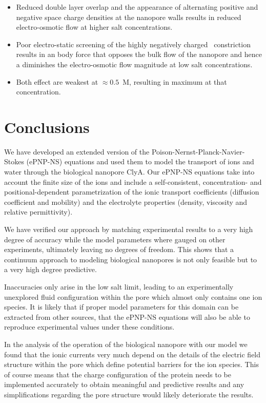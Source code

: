 \documentclass[journal=ancac3,manuscript=article,etalmode=truncate,maxauthors=0,layout=twocolumn]{achemso}
\begin{document}
\begin{itemize}
  \item Reduced double layer overlap and the appearance of alternating positive and negative space charge
  densities at the nanopore walls results in reduced electro-osmotic flow at higher salt concentrations.
  \item Poor electro-static screening of the highly negatively charged \trans\ constriction
  results in an body force that opposes the bulk flow of the nanopore and hence a diminishes the
  electro-osmotic flow magnitude at low salt concentrations.
  \item Both effect are weakest at $\approx0.5$~M, resulting in maximum at that concentration.
\end{itemize}

\section{Conclusions}\label{sec:conclusions}
We have developed an extended version of the Poison-Nernst-Planck-Navier-Stokes (ePNP-NS) equations and used
them to model the transport of ions and water through the biological nanopore ClyA. Our ePNP-NS equations take
into account the finite size of the ions and include a self-consistent, concentration- and
positional-dependent parametrization of the ionic transport coefficients (diffusion coefficient and mobility)
and the electrolyte properties (density, viscosity and relative permittivity).

We have verified our approach by matching experimental results to a very high degree of accuracy while
the model parameters where gauged on other experiments, ultimately leaving no degrees of freedom. This shows
that a continuum approach to modeling biological nanopores is not only feasible but to a very high degree
predictive.

Inaccuracies only arise in the low salt limit, leading to an experimentally unexplored fluid configuration
within the pore which almost only contains one ion species. It is likely that if proper model parameters for
this domain can be extracted from other sources, that the ePNP-NS equations will also be able to reproduce
experimental values under these conditions.

In the analysis of the operation of the biological nanopore with our model we found that the ionic currents
very much depend on the details of the electric field structure within the pore which define potential
barriers for the ion species. This of course means that the charge configuration of the protein needs to be
implemented accurately to obtain meaningful and predictive results and any simplifications regarding the pore
structure would likely deteriorate the results.
\end{document}
